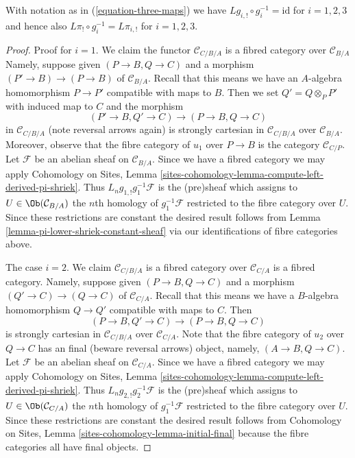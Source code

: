 \begin{lemma}
\label{lemma-triangle-compute-lower-shriek}
With notation as in (\ref{equation-three-maps}) we have
$Lg_{i, !} \circ g_i^{-1} = \text{id}$ for $i = 1, 2, 3$
and hence also $L\pi_! \circ g_i^{-1} = L\pi_{i, !}$ for
$i = 1, 2, 3$.
\end{lemma}

\begin{proof}
Proof for $i = 1$. We claim the functor $\mathcal{C}_{C/B/A}$
is a fibred category over $\mathcal{C}_{B/A}$
Namely, suppose given $(P \to B, Q \to C)$
and a morphism $(P' \to B) \to (P \to B)$ of $\mathcal{C}_{B/A}$.
Recall that this means we have an $A$-algebra homomorphism
$P \to P'$ compatible with maps to $B$. Then we set $Q' = Q \otimes_P P'$
with induced map to $C$ and the morphism
$$
(P' \to B, Q' \to C) \longrightarrow (P \to B, Q \to C)
$$
in $\mathcal{C}_{C/B/A}$ (note reversal arrows again) is strongly cartesian
in $\mathcal{C}_{C/B/A}$ over $\mathcal{C}_{B/A}$. Moreover, observe
that the fibre category of $u_1$ over $P \to B$ is the category
$\mathcal{C}_{C/P}$. Let $\mathcal{F}$ be an abelian sheaf on
$\mathcal{C}_{B/A}$. Since we have a fibred category we may apply
Cohomology on Sites, Lemma
\ref{sites-cohomology-lemma-compute-left-derived-pi-shriek}.
Thus $L_ng_{1, !}g_1^{-1}\mathcal{F}$ is the (pre)sheaf
which assigns to $U \in \Ob(\mathcal{C}_{B/A})$ the $n$th homology of
$g_1^{-1}\mathcal{F}$ restricted to the fibre category over $U$.
Since these restrictions are constant the desired result follows from
Lemma \ref{lemma-pi-lower-shriek-constant-sheaf}
via our identifications of fibre categories above.

\medskip\noindent
The case $i = 2$.
We claim $\mathcal{C}_{C/B/A}$ is a fibred category over $\mathcal{C}_{C/A}$
is a fibred category. Namely, suppose given $(P \to B, Q \to C)$
and a morphism $(Q' \to C) \to (Q \to C)$ of $\mathcal{C}_{C/A}$.
Recall that this means we have a $B$-algebra homomorphism
$Q \to Q'$ compatible with maps to $C$. Then
$$
(P \to B, Q' \to C) \longrightarrow (P \to B, Q \to C)
$$
is strongly cartesian in $\mathcal{C}_{C/B/A}$ over $\mathcal{C}_{C/A}$.
Note that the fibre category of $u_2$ over $Q \to C$ has an final
(beware reversal arrows) object, namely, $(A \to B, Q \to C)$. Let
$\mathcal{F}$ be an abelian sheaf on $\mathcal{C}_{C/A}$.
Since we have a fibred category we may apply
Cohomology on Sites, Lemma
\ref{sites-cohomology-lemma-compute-left-derived-pi-shriek}.
Thus $L_ng_{2, !}g_2^{-1}\mathcal{F}$ is the (pre)sheaf
which assigns to $U \in \Ob(\mathcal{C}_{C/A})$ the $n$th homology of
$g_1^{-1}\mathcal{F}$ restricted to the fibre category over $U$.
Since these restrictions are constant the desired result follows from
Cohomology on Sites, Lemma \ref{sites-cohomology-lemma-initial-final}
because the fibre categories all have final objects.


\end{proof}

